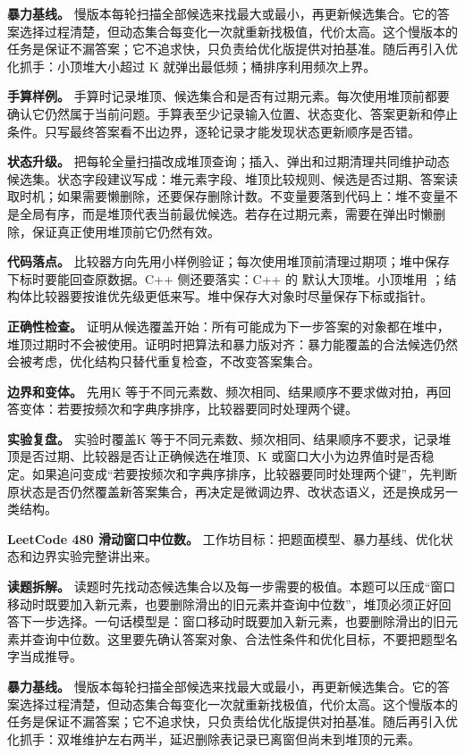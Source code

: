 \textbf{暴力基线。} 慢版本每轮扫描全部候选来找最大或最小，再更新候选集合。它的答案选择过程清楚，但动态集合每变化一次就重新找极值，代价太高。这个慢版本的任务是保证不漏答案；它不追求快，只负责给优化版提供对拍基准。随后再引入优化抓手：小顶堆大小超过 K 就弹出最低频；桶排序利用频次上界。

\textbf{手算样例。} 手算时记录堆顶、候选集合和是否有过期元素。每次使用堆顶前都要确认它仍然属于当前问题。手算表至少记录输入位置、状态变化、答案更新和停止条件。只写最终答案看不出边界，逐轮记录才能发现状态更新顺序是否错。

\textbf{状态升级。} 把每轮全量扫描改成堆顶查询；插入、弹出和过期清理共同维护动态候选集。状态字段建议写成：堆元素字段、堆顶比较规则、候选是否过期、答案读取时机；如果需要懒删除，还要保存删除计数。不变量要落到代码上：堆不变量不是全局有序，而是堆顶代表当前最优候选。若存在过期元素，需要在弹出时懒删除，保证真正使用堆顶前它仍然有效。

\textbf{代码落点。} 比较器方向先用小样例验证；每次使用堆顶前清理过期项；堆中保存下标时要能回查原数据。C++ 侧还要落实：C++ 的  默认大顶堆。小顶堆用 ；结构体比较器要按谁优先级更低来写。堆中保存大对象时尽量保存下标或指针。

\textbf{正确性检查。} 证明从候选覆盖开始：所有可能成为下一步答案的对象都在堆中，堆顶过期时不会被使用。证明时把算法和暴力版对齐：暴力能覆盖的合法候选仍然会被考虑，优化结构只替代重复检查，不改变答案集合。

\textbf{边界和变体。} 先用K 等于不同元素数、频次相同、结果顺序不要求做对拍，再回答变体：若要按频次和字典序排序，比较器要同时处理两个键。

\textbf{实验复盘。} 实验时覆盖K 等于不同元素数、频次相同、结果顺序不要求，记录堆顶是否过期、比较器是否让正确候选在堆顶、K 或窗口大小为边界值时是否稳定。如果追问变成“若要按频次和字典序排序，比较器要同时处理两个键”，先判断原状态是否仍然覆盖新答案集合，再决定是微调边界、改状态语义，还是换成另一类结构。

\noindent\textbf{LeetCode 480 滑动窗口中位数。} 工作坊目标：把题面模型、暴力基线、优化状态和边界实验完整讲出来。

\textbf{读题拆解。} 读题时先找动态候选集合以及每一步需要的极值。本题可以压成“窗口移动时既要加入新元素，也要删除滑出的旧元素并查询中位数”，堆顶必须正好回答下一步选择。一句话模型是：窗口移动时既要加入新元素，也要删除滑出的旧元素并查询中位数。这里要先确认答案对象、合法性条件和优化目标，不要把题型名字当成推导。

\textbf{暴力基线。} 慢版本每轮扫描全部候选来找最大或最小，再更新候选集合。它的答案选择过程清楚，但动态集合每变化一次就重新找极值，代价太高。这个慢版本的任务是保证不漏答案；它不追求快，只负责给优化版提供对拍基准。随后再引入优化抓手：双堆维护左右两半，延迟删除表记录已离窗但尚未到堆顶的元素。


